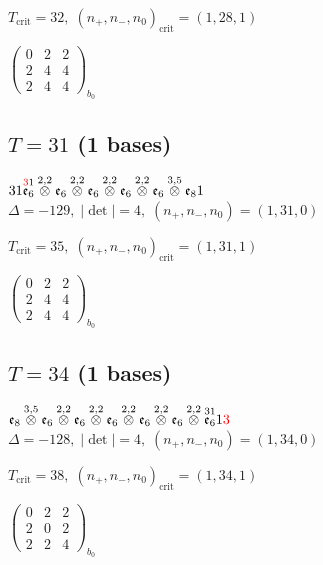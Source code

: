 \documentclass[10pt]{article}
\begin{document}
\hspace{1em}$T_{\text{crit}}=32,\; (n_+,n_-,n_0)_{\text{crit}}=(1,28,1)$

\hspace{2em}$\left(\begin{smallmatrix}0 & 2 & 2 \\ 2 & 4 & 4 \\ 2 & 4 & 4\end{smallmatrix}\right)_{\!b_0}$


\subsection*{$T = 31$ \quad (1 bases)}
\smallskip

$31\overset{\textcolor{red}{3}1}{\mathfrak{e}_6}\overset{2,2}{\otimes}\mathfrak{e}_6\overset{2,2}{\otimes}\mathfrak{e}_6\overset{2,2}{\otimes}\mathfrak{e}_6\overset{2,2}{\otimes}\mathfrak{e}_6\overset{3,5}{\otimes}\mathfrak{e}_81$ \quad $\Delta=-129,\; |\det|=4,\; (n_+,n_-,n_0)=(1,31,0)$

\hspace{1em}$T_{\text{crit}}=35,\; (n_+,n_-,n_0)_{\text{crit}}=(1,31,1)$

\hspace{2em}$\left(\begin{smallmatrix}0 & 2 & 2 \\ 2 & 4 & 4 \\ 2 & 4 & 4\end{smallmatrix}\right)_{\!b_0}$


\subsection*{$T = 34$ \quad (1 bases)}
\smallskip

$\mathfrak{e}_8\overset{3,5}{\otimes}\mathfrak{e}_6\overset{2,2}{\otimes}\mathfrak{e}_6\overset{2,2}{\otimes}\mathfrak{e}_6\overset{2,2}{\otimes}\mathfrak{e}_6\overset{2,2}{\otimes}\mathfrak{e}_6\overset{2,2}{\otimes}\overset{31}{\mathfrak{e}_6}1\textcolor{red}{3}$ \quad $\Delta=-128,\; |\det|=4,\; (n_+,n_-,n_0)=(1,34,0)$

\hspace{1em}$T_{\text{crit}}=38,\; (n_+,n_-,n_0)_{\text{crit}}=(1,34,1)$

\hspace{2em}$\left(\begin{smallmatrix}0 & 2 & 2 \\ 2 & 0 & 2 \\ 2 & 2 & 4\end{smallmatrix}\right)_{\!b_0}$
\end{document}
